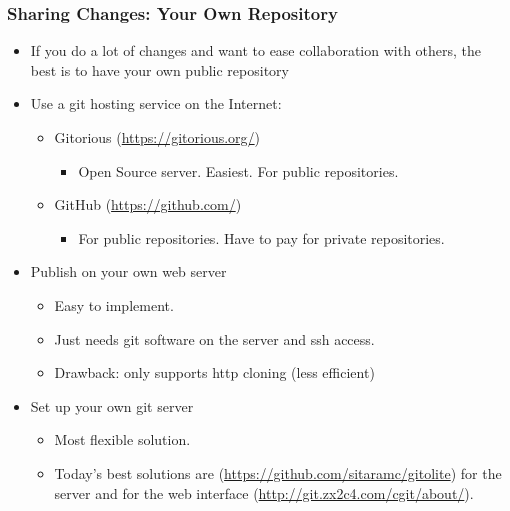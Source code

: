 \begin{frame}
  \frametitle{Sharing Changes: Your Own Repository}
  \begin{itemize}
  \item If you do a lot of changes and want to ease collaboration with
    others, the best is to have your own public repository
  \item Use a git hosting service on the Internet:
    \begin{itemize}
    \item Gitorious (\url{https://gitorious.org/})
      \begin{itemize}
      \item Open Source server. Easiest. For public repositories.
      \end{itemize}
    \item GitHub (\url{https://github.com/})
      \begin{itemize}
      \item For public repositories. Have to pay for private
        repositories.
      \end{itemize}
    \end{itemize}
  \item Publish on your own web server
    \begin{itemize}
    \item Easy to implement.
    \item Just needs git software on the server and ssh access.
    \item Drawback: only supports http cloning (less efficient)
    \end{itemize}
  \item Set up your own git server
    \begin{itemize}
    \item Most flexible solution.
    \item Today's best solutions are 
      (\url{https://github.com/sitaramc/gitolite}) for the server and
       for the web interface
      (\url{http://git.zx2c4.com/cgit/about/}).
    \end{itemize}
  \end{itemize}
\end{frame}

